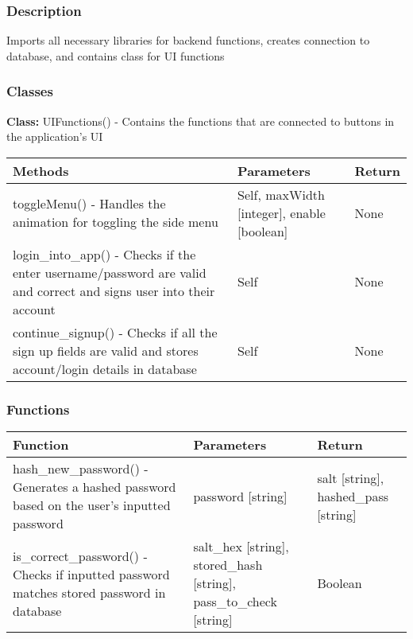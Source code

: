 \documentclass[12pt, titlepage]{article}
\begin{document}
    \subsubsection{Description}
    Imports all necessary libraries for backend functions, creates connection to database, and contains class for UI functions
    
    \subsubsection{Classes}
    \textbf{Class:} UIFunctions() - Contains the functions that are connected to buttons in the application’s UI \\
    
      \noindent \begin{tabular}{| p{} | p{}| p{}|}
        \hline
        \rowcolor[gray]{0.9}
        Methods & Parameters & Return\\
        \hline
        toggleMenu() - Handles the animation for toggling the side menu &Self, maxWidth [integer], enable [boolean] & None \\
        \hline
        login\_into\_app() - Checks if the enter username/password are valid and correct and signs user into their account & Self & None \\
        \hline
        continue\_signup() - Checks if all the sign up fields are valid and stores account/login details in database & Self & None \\
        \hline
      \end{tabular}

  \subsubsection{Functions}
    \noindent \begin{tabular}{| p{} | p{}| p{}|}
      \hline
      \rowcolor[gray]{0.9}
      Function & Parameters & Return\\
      \hline
      hash\_new\_password() - Generates a hashed password based on the user’s inputted password & password [string] & salt [string], hashed\_pass [string] \\
      \hline
      is\_correct\_password() - Checks if inputted password matches stored password in database & salt\_hex [string], stored\_hash [string], pass\_to\_check [string] & Boolean \\
      \hline
    \end{tabular}
\end{document}
